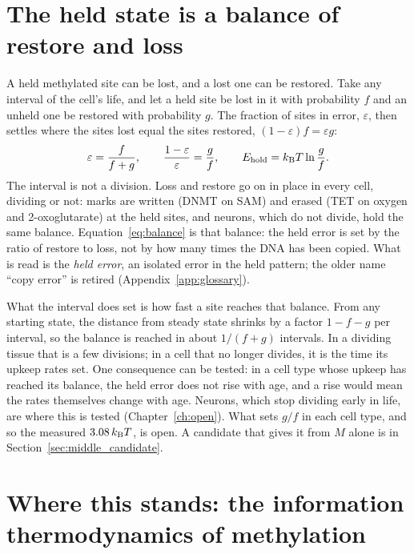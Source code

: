 \section{The held state is a balance of restore and loss}\label{sec:balance}

A held methylated site can be lost, and a lost one can be restored. Take any interval of the cell's life, and let a held site be lost in
it with probability $f$ and an unheld one be restored with probability $g$. The fraction of sites in error, $\varepsilon$, then settles where the
sites lost equal the sites restored, $(1-\varepsilon)f=\varepsilon g$:
\begin{equation}
  \varepsilon=\frac{f}{f+g},\qquad \frac{1-\varepsilon}{\varepsilon}=\frac{g}{f},\qquad E_{\rm hold}=k_{\mathrm B} T\ln\frac{g}{f}.
  \label{eq:balance}
\end{equation}
\derived{} The interval is not a division. Loss and restore go on in place in every cell, dividing or not: marks are written (DNMT on SAM)
and erased (TET on oxygen and 2-oxoglutarate) at the held sites, and neurons, which do not divide, hold the same balance.
Equation~\eqref{eq:balance} is that balance: the held error is set by the ratio of restore to loss, not by how many times the DNA has been
copied. \derived{} What is read is the \emph{held error}, an isolated error in the held pattern; the older name ``copy error'' is retired
(Appendix~\ref{app:glossary}).

What the interval does set is how fast a site reaches that balance. From any starting state, the distance from steady state shrinks by a
factor $1-f-g$ per interval, so the balance is reached in about $1/(f+g)$ intervals. \derived{} In a dividing tissue that is a few divisions;
in a cell that no longer divides, it is the time its upkeep rates set. One consequence can be tested: in a cell type whose upkeep has reached
its balance, the held error does not rise with age, and a rise would mean the rates themselves change with age. \prediction{} Neurons, which
stop dividing early in life, are where this is tested (Chapter~\ref{ch:open}). What sets $g/f$ in each cell type, and so the measured
$3.08\,k_{\mathrm B} T$, is open. \openprob{} A candidate that gives it from $M$ alone is in Section~\ref{sec:middle_candidate}. \conjecture

\section{Where this stands: the information thermodynamics of methylation}\label{sec:sanchez}

